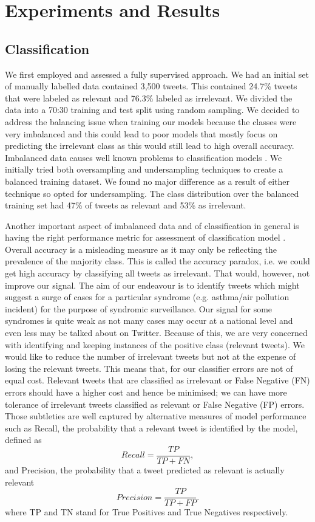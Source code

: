 \documentclass[10pt,letterpaper]{article}
\begin{document}
\section{Experiments and Results}
\label{Results}
\subsection{Classification}
We first employed and assessed a fully supervised approach. We had an initial set of manually labelled data contained 3,500 tweets. This contained 24.7\% tweets that were labeled as relevant and 76.3\% labeled as irrelevant. We divided the data into a 70:30 training and test split using random sampling. We decided to address the balancing issue when training our models because the classes were very imbalanced and this could lead to poor models that mostly focus on predicting the irrelevant class as this would still lead to high overall accuracy.  Imbalanced data causes well known problems to classification models \cite{REF85}.   We initially tried both oversampling and undersampling techniques to create a balanced training dataset. We found no major difference as a result of either technique so opted for undersampling. The class distribution over the balanced training set had 47\% of tweets as relevant and 53\% as irrelevant.

Another important aspect of imbalanced data  and of classification in general is having the right performance metric for assessment of classification model \cite{REF86,REF37}.  Overall accuracy is a misleading measure as it may only be reflecting the prevalence of the majority class. This is called the accuracy paradox, i.e. we could get high accuracy by classifying all tweets as irrelevant. That would, however, not improve our signal.  The aim of our endeavour is to identify tweets which might suggest a surge of cases for a particular syndrome (e.g. asthma/air pollution incident) for the purpose of syndromic surveillance. Our signal for some syndromes is quite weak as not many cases may occur at a national level and even less may be talked about on Twitter.  Because of this, we are very concerned with identifying and keeping instances of the positive class (relevant tweets). We would like to reduce the number of irrelevant tweets but not at the expense of losing the relevant tweets.  This means that, for our classifier errors are not of equal cost.  Relevant tweets that are classified as irrelevant or False Negative (FN) errors should have a higher cost and hence be minimised; we can have more tolerance of irrelevant tweets classified as relevant or False Negative (FP) errors.  Those subtleties are well captured by alternative measures of model performance  \cite{REF38} such as Recall, the probability that a relevant tweet is identified by the model, defined as 
\begin{equation}
Recall= \frac{TP}{TP+FN},
\end{equation}
and Precision, the probability that a tweet predicted as relevant is actually relevant
\begin{equation}
Precision= \frac{TP}{TP+FP}.
\end{equation}
where TP and TN stand for True Positives and True Negatives respectively.
\end{document}

